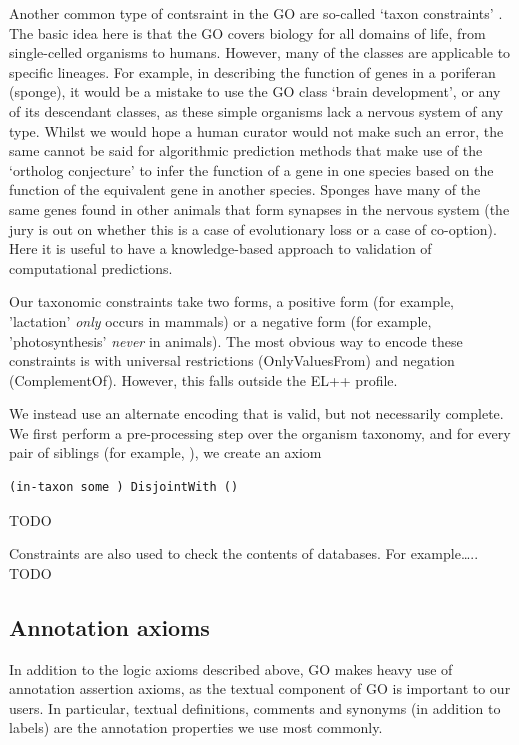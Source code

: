\documentclass{llncs}
\begin{document}
Another common type of contsraint in the GO are so-called `taxon
constraints' \cite{Deegan2010}. The basic idea here is that the GO
covers biology for all domains of life, from single-celled organisms
to humans. However, many of the classes are applicable to specific
lineages. For example, in describing the function of genes in a
poriferan (sponge), it would be a mistake to use the GO class ‘brain
development’, or any of its descendant classes, as these simple
organisms lack a nervous system of any type. Whilst we would hope a
human curator would not make such an error, the same cannot be said
for algorithmic prediction methods that make use of the `ortholog
conjecture'\cite{Thomas2012} to infer the function of a gene in one
species based on the function of the equivalent gene in another
species. Sponges have many of the same genes found in other animals
that form synapses in the nervous system (the jury is out on whether
this is a case of evolutionary loss or a case of co-option). Here it
is useful to have a knowledge-based approach to validation of
computational predictions.

Our taxonomic constraints take two forms, a positive form (for
example, 'lactation' \emph{only} occurs in mammals) or a negative form
(for example, 'photosynthesis' \emph{never} in animals). The most
obvious way to encode these constraints is with universal restrictions
(OnlyValuesFrom) and negation (ComplementOf). However, this falls
outside the EL++ profile.

We instead use an alternate encoding that is valid, but not
necessarily complete. We first perform a pre-processing step over the
organism taxonomy, and for every pair of siblings (for example, ), we
create an axiom

\begin{verbatim}
(in-taxon some ) DisjointWith ()
\end{verbatim}

TODO

Constraints are also used to check the contents of databases. For
example….. TODO


\subsection{Annotation axioms}

In addition to the logic axioms described above, GO makes heavy use of
annotation assertion axioms, as the textual component of GO is
important to our users. In particular, textual definitions, comments
and synonyms (in addition to labels) are the annotation properties we
use most commonly.
\end{document}
